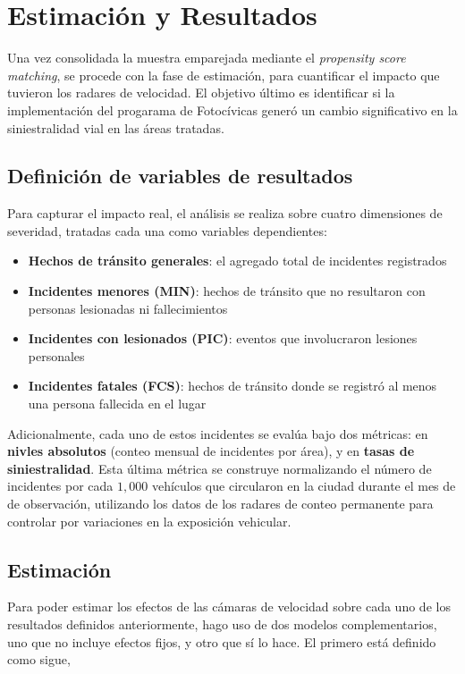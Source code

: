 \chapter{Estimación y Resultados}

\noindent Una vez consolidada la muestra emparejada mediante el \textit{propensity score matching}, se procede con la fase de estimación, para cuantificar el impacto que tuvieron los radares de velocidad. El objetivo último es identificar si la implementación del progarama de Fotocívicas generó un cambio significativo en la siniestralidad vial en las áreas tratadas.

\section{Definición de variables de resultados}
\noindent Para capturar el impacto real, el análisis se realiza sobre cuatro dimensiones de severidad, tratadas cada una como variables dependientes:

\begin{itemize}
    \item \textbf{Hechos de tránsito generales}: el agregado total de incidentes registrados
    \item \textbf{Incidentes menores (MIN)}: hechos de tránsito que no resultaron con personas lesionadas ni fallecimientos
    \item \textbf{Incidentes con lesionados (PIC)}: eventos que involucraron lesiones personales 
    \item \textbf{Incidentes fatales (FCS)}: hechos de tránsito donde se registró al menos una persona fallecida en el lugar
\end{itemize}

Adicionalmente, cada uno de estos incidentes se evalúa bajo dos métricas: en \textbf{nivles absolutos} (conteo mensual de incidentes por área), y en \textbf{tasas de siniestralidad}. Esta última métrica se construye normalizando el número de incidentes por cada $1,000$ vehículos que circularon en la ciudad durante el mes de de observación, utilizando los datos de los radares de conteo permanente para controlar por variaciones en la exposición vehicular. 

\section{Estimación}
\noindent Para poder estimar los efectos de las cámaras de velocidad sobre cada uno de los resultados definidos anteriormente, hago uso de dos modelos complementarios, uno que no incluye efectos fijos, y otro que sí lo hace. El primero está definido como sigue,

